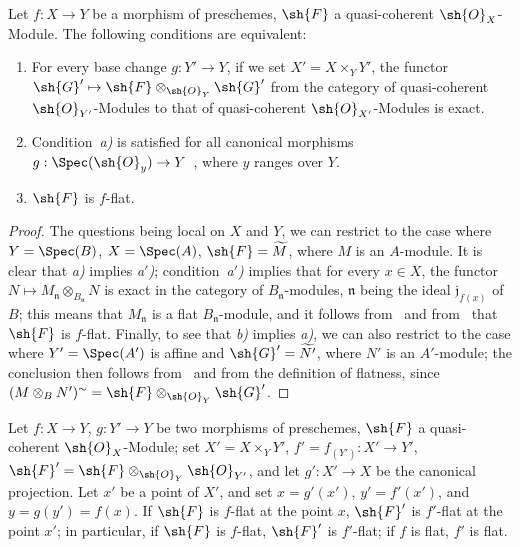 \begin{proposition}[2.1.3]
\label{IV.2.1.3}
Let $f:X\to Y$ be a morphism of preschemes, $\sh{F}$ a quasi-coherent $\sh{O}_X$-Module. The following conditions are equivalent:
\begin{enumerate}
  \item[\emph{a)}] For every base change $g:Y'\to Y$, if we set $X'=X\times_Y Y'$, the functor $\sh{G}'\mapsto\sh{F}\otimes_{\sh{O}_Y}\sh{G}'$ from the category of quasi-coherent $\sh{O}_{Y'}$-Modules to that of quasi-coherent $\sh{O}_{X'}$-Modules is exact.
  \item[\emph{a$'$)}] Condition~\emph{a)} is satisfied for all canonical morphisms $g:\Spec(\sh{O}_y)\to Y$~, where $y$ ranges over $Y$.
  \item[\emph{b)}] $\sh{F}$ is $f$-flat.
\end{enumerate}
\end{proposition}

\begin{proof}
The questions being local on $X$ and $Y$, we can restrict to the case where $Y=\Spec(B)$, $X=\Spec(A)$, $\sh{F}=\widetilde{M}$, where $M$ is an $A$-module.
It is clear that \emph{a)} implies \emph{a$'$)};
condition~\emph{a$'$)} implies that for every $x\in X$, the functor $N\mapsto M_\mathfrak{n}\otimes_{B_\mathfrak{n}}N$ is exact in the category of $B_\mathfrak{n}$-modules, $\mathfrak{n}$ being the ideal $\mathfrak{j}_{f(x)}$ of $B$; this means that $M_\mathfrak{n}$ is a flat $B_\mathfrak{n}$-module, and it follows from~ and from~ that $\sh{F}$ is $f$-flat.
Finally, to see that \emph{b)} implies \emph{a)}, we can also restrict to the case where $Y'=\Spec(A')$ is affine and $\sh{G}'=\widetilde{N'}$, where $N'$ is an $A'$-module; the conclusion then follows from~ and from the definition of flatness, since $(M\otimes_B N')^{\sim}=\sh{F}\otimes_{\sh{O}_Y}\sh{G}'$.
\end{proof}

\begin{proposition}[2.1.4]
\label{IV.2.1.4}
Let $f:X\to Y$, $g:Y'\to Y$ be two morphisms of preschemes, $\sh{F}$ a quasi-coherent $\sh{O}_X$-Module; set $X'=X\times_Y Y'$, $f'=f_{(Y')}:X'\to Y'$, $\sh{F}'=\sh{F}\otimes_{\sh{O}_Y}\sh{O}_{Y'}$, and let $g':X'\to X$ be the canonical projection.
Let $x'$ be a point of $X'$, and set $x=g'(x')$, $y'=f'(x')$, and $y=g(y')=f(x)$.
If $\sh{F}$ is $f$-flat at the point $x$, $\sh{F}'$ is $f'$-flat at the point $x'$; in particular, if $\sh{F}$ is $f$-flat, $\sh{F}'$ is $f'$-flat; if $f$ is flat, $f'$ is flat.
\end{proposition}

